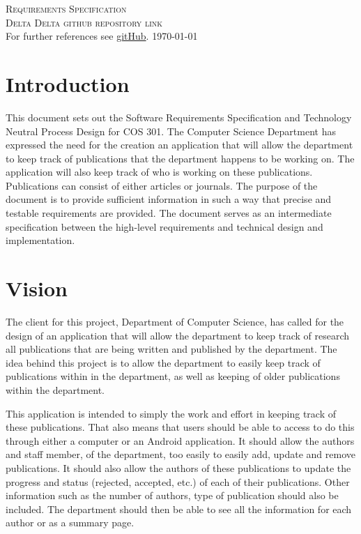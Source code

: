 \documentclass[a4paper,12pt]{report}
\begin{document}
\renewcommand{\thesection}{\arabic{section}}
\newpage
\begin{center}
\textsc{\LARGE Requirements Specification}\\[1.5cm]
\textsc{\Large Delta Delta github repository link}\\[0.5cm]
For further references see \href{https://github.com/u12081095/COS301-Team-Delta}{gitHub}.
\today
\end{center}


\newpage
\section{Introduction}

This document sets out the Software Requirements Specification and Technology Neutral Process Design for COS 301. The Computer Science Department has expressed the need for the creation an application that will allow the department to keep track of publications that the department happens to be working on. The application will also keep track of who is working on these publications. Publications can consist of either articles or journals. The purpose of the document is to provide sufficient information in such a way that precise and testable requirements are provided. The document serves as an intermediate specification between the high-level requirements and technical design and implementation. 

\newpage
\section{Vision}

The client for this project, Department of Computer Science, has called for the design of an application that will allow the department to keep track of research all publications that are being written and published by the department.  The idea behind this project is to allow the department to easily keep track of publications within in the department, as well as keeping of older publications within the department.

This application is intended to simply the work and effort in keeping track of these publications. That also means that users should be able to access to do this through either a computer or an Android application. It should allow the authors and staff member, of the department, too easily to easily add, update and remove publications. It should also allow the authors of these publications to update the progress and status (rejected, accepted, etc.) of each of their publications. Other information such as the number of authors, type of publication should also be included. The department should then be able to see all the information for each author or as a summary page.
\end{document}
